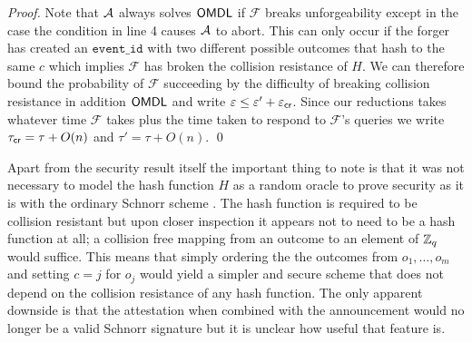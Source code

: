 \documentclass[runningheads]{llncs}
\newcommand{\eventid}{\mathtt{event\_id}}
\newcommand{\F}{\mathcal{F}}
\begin{document}
\begin{proof}
    Note that $\mathcal{A}$ always solves $\mathsf{OMDL}$ if $\F$ breaks unforgeability except in the case the condition in line 4 causes $\mathcal{A}$ to abort.
    This can only occur if the forger has created an $\eventid$ with two different possible outcomes that hash to the same $c$ which implies $\F$ has broken the collision resistance of $H$.
    We can therefore bound the probability of $\F$ succeeding by the difficulty of breaking collision resistance in addition $\mathsf{OMDL}$ and write $\varepsilon \leq \varepsilon' + \varepsilon_{\mathsf{cr}}$.
    Since our reductions takes whatever time $\F$ takes plus the time taken to respond to $\F$'s queries we write $\tau_{\mathsf{cr}} = \tau + O(n)$ and $\tau' = \tau + O(n)$.
\qed
\end{proof}


Apart from the security result itself the important thing to note is that it was not necessary to model the hash function $H$ as a random oracle to prove security as it is with the ordinary Schnorr scheme \cite{pointcheval2000security}.
The hash function is required to be collision resistant but upon closer inspection it appears not to need to be a hash function at all; a collision free mapping from an outcome to an element of $\mathbb{Z}_q$ would suffice.
This means that simply ordering the the outcomes from $o_{1},\ldots,o_{m}$ and setting $c = j$ for $o_{j}$ would yield a simpler and secure scheme that does not depend on the collision resistance of any hash function.
The only apparent downside is that the attestation when combined with the announcement would no longer be a valid Schnorr signature but it is unclear how useful that feature is.

{}

\end{document}
